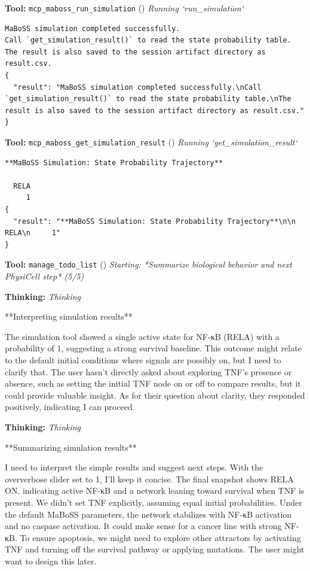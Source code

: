\documentclass[11pt,a4paper]{article}
\begin{document}
\begin{toolokbox}
\textbf{Tool:} \texttt{mcp\_maboss\_run\_simulation} (\checkmark)
\textit{Running `run\_simulation`}
\begin{lstlisting}
MaBoSS simulation completed successfully.
Call `get_simulation_result()` to read the state probability table.
The result is also saved to the session artifact directory as result.csv.
{
  "result": "MaBoSS simulation completed successfully.\nCall `get_simulation_result()` to read the state probability table.\nThe result is also saved to the session artifact directory as result.csv."
}
\end{lstlisting}
\end{toolokbox}
\begin{toolokbox}
\textbf{Tool:} \texttt{mcp\_maboss\_get\_simulation\_result} (\checkmark)
\textit{Running `get\_simulation\_result`}
\begin{lstlisting}
**MaBoSS Simulation: State Probability Trajectory**

  RELA
     1
{
  "result": "**MaBoSS Simulation: State Probability Trajectory**\n\n  RELA\n     1"
}
\end{lstlisting}
\end{toolokbox}
\begin{toolokbox}
\textbf{Tool:} \texttt{manage\_todo\_list} (\checkmark)
\textit{Starting: *Summarize biological behavior and next PhysiCell step* (5/5)}
\end{toolokbox}
\begin{thinkbox}
\textbf{Thinking:} \textit{Thinking}

**Interpreting simulation results**

The simulation tool showed a single active state for NF-κB (RELA) with a probability of 1, suggesting a strong survival baseline. This outcome might relate to the default initial conditions where signals are possibly on, but I need to clarify that. The user hasn't directly asked about exploring TNF's presence or absence, such as setting the initial TNF node on or off to compare results, but it could provide valuable insight. As for their question about clarity, they responded positively, indicating I can proceed.

\end{thinkbox}
\begin{thinkbox}
\textbf{Thinking:} \textit{Thinking}

**Summarizing simulation results**

I need to interpret the simple results and suggest next steps. With the oververbose slider set to 1, I'll keep it concise. The final snapshot shows RELA ON, indicating active NF-κB and a network leaning toward survival when TNF is present. We didn't set TNF explicitly, assuming equal initial probabilities. Under the default MaBoSS parameters, the network stabilizes with NF-κB activation and no caspase activation. It could make sense for a cancer line with strong NF-κB. To ensure apoptosis, we might need to explore other attractors by activating TNF and turning off the survival pathway or applying mutations. The user might want to design this later.

\end{thinkbox}
\end{document}
